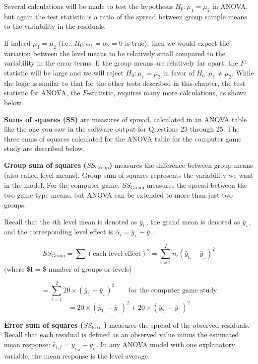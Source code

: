 \documentclass[
]{report}
\begin{document}
Several calculations will be made to test the hypothesis \(H_0\!:\! \mu_1 = \mu_2\) in ANOVA, but again the test statistic is a ratio of the spread between group sample means to the variability in the residuals.

If indeed \(\mu_1 = \mu_2\) (i.e., \(H_0\!:\! \alpha_1 = \alpha_2 = 0\) is true), then we would expect the variation between the level means to be relatively small compared to the variability in the error terms. If the group means are relatively far apart, the \(F\)-statistic will be large and we will reject \(H_0\!:\! \mu_1 = \mu_2\) in favor of \(H_a\!:\! \mu_1 \ne \mu_2\). While the logic is similar to that for the other tests described in this chapter, the test statistic for ANOVA, the \(F\)-statistic, requires many more calculations, as shown below.

\textbf{Sums of squares (SS)} are measures of spread, calculated in an ANOVA table like the one you saw in the software output for Questions 23 through 25. The three sums of squares calculated for the ANOVA table for the computer game study are described below.

\textbf{Group sum of squares (\(SS_{\text{Group}}\))} measures the difference between group means (also called level means). Group sum of squares represents the variability we want in the model. For the computer game, \(SS_{\text{Group}}\) measures the spread between the two game type means, but ANOVA can be extended to more than just two groups.

Recall that the \(i\)th level mean is denoted as \(\bar{y}_{i.}\), the grand mean is denoted as \(\bar{y}_{..}\), and the corresponding level effect is \(\hat{\alpha}_i = \bar{y}_{i.} - \bar{y}_{..}\).

\[
SS_{\text{Group}} = \sum (\text{each level effect})^2 = \sum_{i=1}^{I} n_i (\bar{y}_{i.} - \bar{y}_{..})^2
\]
(where \$I = \$ number of groups or levels)

\[
= \sum_{i=1}^{2} 20 \times (\bar{y}_{i.} - \bar{y}_{..})^2 \qquad \text{for the computer game study}
\]
\[
= 20 \times (\bar{y}_{1.} - \bar{y}_{..})^2 + 20 \times (\bar{y}_{2.} - \bar{y}_{..})^2
\]

\textbf{Error sum of squares (\(SS_{\text{Error}}\))} measures the spread of the observed residuals. Recall that each residual is defined as an observed value minus the estimated mean response: \(\hat{e}_{i,j} = y_{i,j} - \bar{y}_{i.}\). In any ANOVA model with one explanatory variable, the mean response is the level average.
\end{document}
